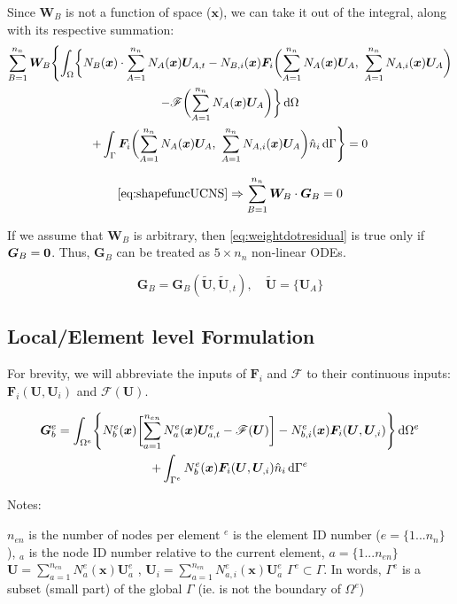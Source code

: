 \documentclass[11pt, letterpaper, twoside]{article}
\renewcommand{\vec}[1]{\bm{#1}}
\newcommand{\vecvec}[1]{\widetilde{\bm{#1}}}
\newcommand{\U}{\vec{U}}
\newcommand{\G}{\vec{G}}
\newcommand{\F}{\vec{F}}
\newcommand{\W}{\vec{W}}
\newcommand{\x}{\vec{x}}
\newcommand{\NAx}{N_A(\x)}
\newcommand{\NBx}{N_B(\x)}
\newcommand{\NAix}{N_{A,i}(\x)}
\newcommand{\NBix}{N_{B,i}(\x)}
\newcommand{\Neax}{N^e_a(\x)}
\newcommand{\Nebx}{N^e_b(\x)}
\newcommand{\Neaix}{N^e_{a,i}(\x)}
\newcommand{\Nebix}{N^e_{b,i}(\x)}
\newcommand{\sumA}[1]{\sum_{A=1}^{#1}}
\newcommand{\sumB}[1]{\sum_{B=1}^{#1}}
\newcommand{\suma}[1]{\sum_{a=1}^{#1}}
\newcommand{\src}{\vec{\mathscr{F}}}
\begin{document}
            Since \(\W_B\) is not a function of space (\(\x\)), we can take it out of the integral, along with its respective summation:
            \begin{multline} \label{eq:shapefuncUCNS}
                \sumB{n_n} \W_B  \Biggl\{\int_\Omega \biggl\{  \NBx  \cdot \sumA{n_n} \NAx \U_{A,t} 
                -  \NBix  \F_i \biggl(\sumA{n_n} \NAx \U_A,\ \sumA{n_n} \NAix \U_A\biggr) \\
                -   \src\biggl(\sumA{n_n} \NAx \U_A \biggr) \biggr\} \dif \Omega \\
                + \int_\Gamma \F_i\biggl(\sumA{n_n} \NAx \U_A,\ \sumA{n_n} \NAix \U_A\biggr) \hat n_i \dif \Gamma \Biggr\} = 0
            \end{multline}

            \begin{equation} \label{eq:weightdotresidual}
                \cref{eq:shapefuncUCNS} \Rightarrow \sumB{n_n} \W_B \cdot \G_B = 0
            \end{equation}

            If we assume that \(\W_B\) is arbitrary, then \cref{eq:weightdotresidual} is true only if \(\G_B=\bf{0}\). Thus, \(\G_B\) can be treated as \(5 \times n_n\) non-linear ODEs.

            \begin{equation*}
                \G_B = \G_B(\vecvec{U}, \vecvec{U}_{,t}), \quad \vecvec{U} = \{\U_A\}
            \end{equation*}


    \subsection{Local/Element level Formulation}
            For brevity, we will abbreviate the inputs of \(\F_i\) and \(\src\) to their continuous inputs: \(\F_i(\U, \U_i)\) and \(\src(\U)\).

            \begin{multline} 
                \G_b^e = \int_{\Omega^e} \Biggl\{ \Nebx \biggl[ \suma{n_{en}} \Neax \U_{a,t}^e - \src(\U) \biggr] - \Nebix \F_i(\U, \U_{,i}) \Biggr\} \dif \Omega^e \\
                + \int_{\Gamma^e} \Nebx \F_i(\U, \U_{,i}) \hat n_i \dif \Gamma^e
            \end{multline}

            Notes:
            \begin{outline}[enumerate]
                \1 \(n_{en}\) is the number of nodes per element
                \1 \(^e\) is the element ID number (\(e = \{1 ... n_n\}\)), 
                \1 \(_a\) is the node ID number relative to the current element, \(a = \{1 ... n_{en}\}\)
                \1 \(\U = \suma{n_{en}} \Neax \U_a^e\) , \(\U_i = \suma{n_{en}} \Neaix \U_a^e\)
                \1 \(\Gamma^e \subset \Gamma \). In words, \(\Gamma^e\) is a subset (small part) of the global \(\Gamma\) (ie. is not the boundary of \(\Omega^e\))
                
            \end{outline}
\end{document}
